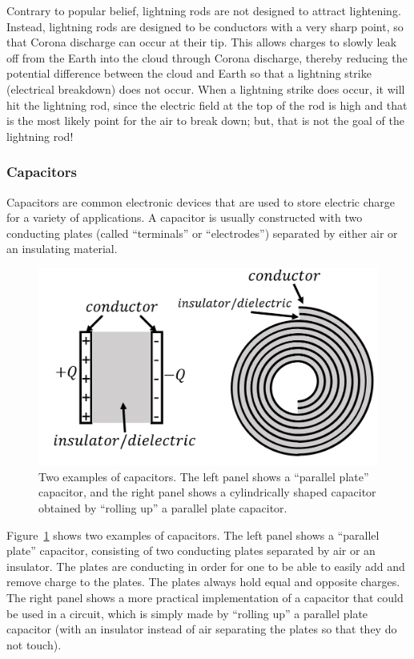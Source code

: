 Contrary to popular belief, lightning rods are not designed to attract lightening. Instead, lightning rods are designed to be conductors with a very sharp point, so that Corona discharge can occur at their tip. This allows charges to slowly leak off from the Earth into the cloud through Corona discharge, thereby reducing the potential difference between the cloud and Earth so that a lightning strike (electrical breakdown) does not occur. When a lightning strike does occur, it will hit the lightning rod, since the electric field at the top of the rod is high and that is the most likely point for the air to break down; but, that is not the goal of the lightning rod!

\subsubsection{Capacitors}\label{sec:potential:capacitors}

Capacitors are common electronic devices that are used to store electric charge for a variety of applications. A capacitor is usually constructed with two conducting plates (called ``terminals'' or ``electrodes'') separated by either air or an insulating material.

\begin{figure}[!htbp]
\centering
\includegraphics[width=0.5\linewidth]{files/capacitors-c81e377aa34e65c60dc580ecd7789fe2.png}
\caption[]{Two examples of capacitors. The left panel shows a ``parallel plate'' capacitor, and the right panel shows a cylindrically shaped capacitor obtained by ``rolling up'' a parallel plate capacitor.}
\label{fig:potential:capacitors}
\end{figure}

Figure~\ref{fig:potential:capacitors} shows two examples of capacitors. The left panel shows a ``parallel plate'' capacitor, consisting of two conducting plates separated by air or an insulator. The plates are conducting in order for one to be able to easily add and remove charge to the plates. The plates always hold equal and opposite charges. The right panel shows a more practical implementation of a capacitor that could be used in a circuit, which is simply made by ``rolling up'' a parallel plate capacitor (with an insulator instead of air separating the plates so that they do not touch).

